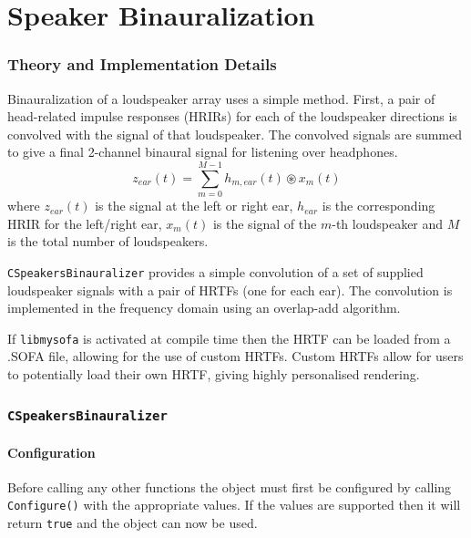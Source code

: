 \documentclass[12pt]{report}
\newcommand{\code}[1]{\texttt{#1}}
\begin{document}
\chapter{Speaker Binauralization}\label{Binauralization}

\subsection{Theory and Implementation Details}
Binauralization of a loudspeaker array uses a simple method.
First, a pair of head-related impulse responses (HRIRs) for each of the loudspeaker directions is convolved with the signal of that loudspeaker.
The convolved signals are summed to give a final 2-channel binaural signal for listening over headphones.
\begin{equation}
    z_{ear}(t) = \sum_{m = 0}^{M - 1} h_{m,ear}(t)\circledast x_{m}(t)
\end{equation}
where $z_{ear}(t)$ is the signal at the left or right ear, $h_{ear}$ is the corresponding HRIR for the left/right ear, $x_{m}(t)$ is the signal of the $m$-th loudspeaker and $M$ is the total number of loudspeakers.

\code{CSpeakersBinauralizer} provides a simple convolution of a set of supplied loudspeaker signals with a pair of HRTFs (one for each ear).
The convolution is implemented in the frequency domain using an overlap-add algorithm.

If \code{libmysofa} is activated at compile time then the HRTF can be loaded from a .SOFA file, allowing for the use of custom HRTFs.
Custom HRTFs allow for users to potentially load their own HRTF, giving highly personalised rendering.

\subsection{\code{CSpeakersBinauralizer}}

\subsubsection{Configuration}

Before calling any other functions the object must first be configured by calling \code{Configure()} with the appropriate values. If the values are supported then it will return \code{true} and the object can now be used.
\end{document}
